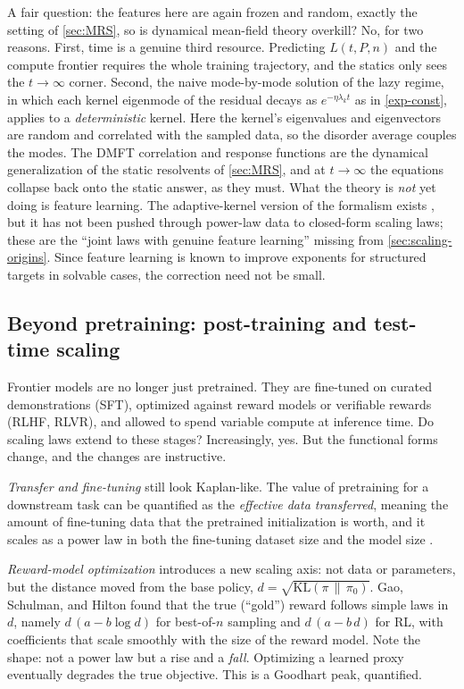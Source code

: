 \documentclass[11pt]{article}
\begin{document}
A fair question: the features here are again frozen and random, exactly the setting of \cref{sec:MRS}, so is dynamical mean-field theory overkill? No, for two reasons. First, time is a genuine third resource. Predicting $L(t,P,n)$ and the compute frontier requires the whole training trajectory, and the statics only sees the $t\to\infty$ corner. Second, the naive mode-by-mode solution of the lazy regime, in which each kernel eigenmode of the residual decays as $e^{-\eta\lambda_k t}$ as in \eqref{exp-const}, applies to a \emph{deterministic} kernel. Here the kernel's eigenvalues and eigenvectors are random and correlated with the sampled data, so the disorder average couples the modes. The DMFT correlation and response functions are the dynamical generalization of the static resolvents of \cref{sec:MRS}, and at $t\to\infty$ the equations collapse back onto the static answer, as they must. What the theory is \emph{not} yet doing is feature learning. The adaptive-kernel version of the formalism exists \cite{bordelon2022self}, but it has not been pushed through power-law data to closed-form scaling laws; these are the ``joint laws with genuine feature learning'' missing from \cref{sec:scaling-origins}. Since feature learning is known to improve exponents for structured targets in solvable cases, the correction need not be small.

\subsection{Beyond pretraining: post-training and test-time scaling}
\label{sec:scaling-posttraining}

Frontier models are no longer just pretrained. They are fine-tuned on curated demonstrations (SFT), optimized against reward models or verifiable rewards (RLHF, RLVR), and allowed to spend variable compute at inference time. Do scaling laws extend to these stages? Increasingly, yes. But the functional forms change, and the changes are instructive.

\emph{Transfer and fine-tuning} still look Kaplan-like. The value of pretraining for a downstream task can be quantified as the \emph{effective data transferred}, meaning the amount of fine-tuning data that the pretrained initialization is worth, and it scales as a power law in both the fine-tuning dataset size and the model size \cite{hernandez2021transfer}.

\emph{Reward-model optimization} introduces a new scaling axis: not data or parameters, but the distance moved from the base policy, $d = \sqrt{\mathrm{KL}(\pi \,\|\, \pi_0)}$. Gao, Schulman, and Hilton \cite{gao2023reward} found that the true (``gold'') reward follows simple laws in $d$, namely $d\,(a - b\log d)$ for best-of-$n$ sampling and $d\,(a - b\,d)$ for RL, with coefficients that scale smoothly with the size of the reward model. Note the shape: not a power law but a rise and a \emph{fall}. Optimizing a learned proxy eventually degrades the true objective. This is a Goodhart peak, quantified.
\end{document}
